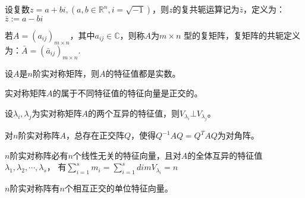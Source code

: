 \begin{Def}
设复数$z=a+bi,(a,b\in\mathbb{R}^n,i=\sqrt{-1})$，则$z$的复共轭运算记为$\bar{z}$，定义为：$\bar{z}:=a-bi$
\end{Def}

\begin{Def}
若$A=(a_{ij})_{m\times n}$，其中$a_{ij}\in\mathbb{C}$，则称$A$为$m\times n$ 型的复矩阵，复矩阵的共轭定义为：$\bar{A}=(\bar{a}_{ij})_{m\times n}$.
\end{Def}

\begin{thm}
设$A$是$n$阶实对称矩阵，则$A$的特征值都是实数。
\end{thm}

\begin{thm}
实对称矩阵$A$的属于不同特征值的特征向量是正交的。
\end{thm}

\begin{cor}
设$\lambda_i,\lambda_j$为实对称矩阵$A$的两个互异的特征值，则$V_{\lambda_i}\bot V_{\lambda_j}$。
\end{cor}

\begin{thm}
对$n$阶实对称阵$A$，总存在正交阵$Q$，使得$Q^{-1}AQ=Q^TAQ$为对角阵。
\end{thm}

\begin{cor}
$n$阶实对称阵必有$n$个线性无关的特征向量，且对$A$的全体互异的特征值
$\lambda_1,\lambda_2,\cdots,\lambda_s$，
有$\sum_{i=1}^s m_i=\sum_{i=1}^s dimV_{\lambda_i}=n$
\end{cor}

\begin{cor}
$n$阶实对称阵有$n$个相互正交的单位特征向量。
\end{cor}


